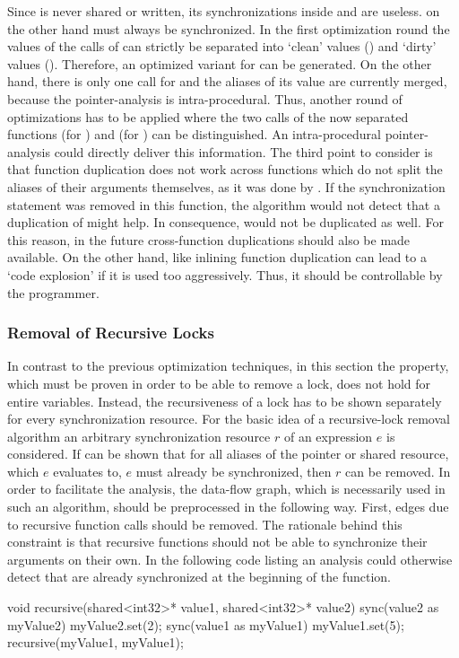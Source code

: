 Since  is never shared or written, its synchronizations inside  and  are useless.  on the other hand must always be synchronized. In the first optimization round the values of the calls of  can strictly be separated into `clean' values () and `dirty' values (). Therefore, an optimized variant for  can be generated. On the other hand, there is only one call for  and the aliases of its value are currently merged, because the pointer-analysis is intra-procedural. Thus, another round of optimizations has to be applied where the two calls of the now separated functions  (for ) and  (for ) can be distinguished. An intra-procedural pointer-analysis could directly deliver this information. The third point to consider is that function duplication does not work across functions which do not split the aliases of their arguments themselves, as it was done by . If the synchronization statement was removed in this function, the algorithm would not detect that a duplication of  might help. In consequence,  would not be duplicated as well. For this reason, in the future cross-function duplications should also be made available. On the other hand, like inlining function duplication can lead to a `code explosion' if it is used too aggressively. Thus, it should be controllable by the programmer.

\subsubsection{Removal of Recursive Locks}
In contrast to the previous optimization techniques, in this section the property, which must be proven in order to be able to remove a lock, does not hold for entire variables. Instead, the recursiveness of a lock has to be shown separately for every synchronization resource. For the basic idea of a recursive-lock removal algorithm an arbitrary synchronization resource $r$ of an expression $e$ is considered. If can be shown that for all aliases of the pointer or shared resource, which $e$ evaluates to, $e$ must already be synchronized, then $r$ can be removed. In order to facilitate the analysis, the data-flow graph, which is necessarily used in such an algorithm, should be preprocessed in the following way. First, edges due to recursive function calls should be removed. The rationale behind this constraint is that recursive functions should not be able to synchronize their arguments on their own. In the following code listing an analysis  could otherwise  detect that   are already synchronized at the beginning of the function.
\begin{ccode}
void recursive(shared<int32>* value1, shared<int32>* value2) {
  sync(value2 as myValue2) {
    myValue2.set(2);
  }
  sync(value1 as myValue1) {
    myValue1.set(5);
    recursive(myValue1, myValue1);
  }
}
\end{ccode}

